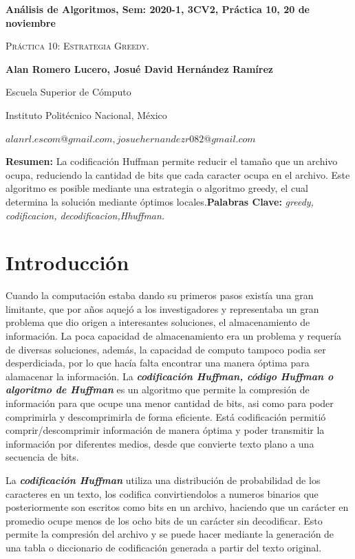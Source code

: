 \documentclass[12pt,twoside]{article}
\date{}
\begin{document}
\centerline{\bf An\'alisis de Algoritmos, Sem: 2020-1, 3CV2, Pr\'actica 10, 20 de noviembre}
\centerline{}
\centerline{}
\begin{center}
\Large{\textsc{Pr\'actica 10: Estrategia Greedy.}}
\end{center}
\centerline{\bf{Alan Romero Lucero, Josu\'e David Hern\'andez Ram\'irez}}
\centerline{}
\centerline{Escuela Superior de C\'omputo}
\centerline{Instituto Polit\'ecnico Nacional, M\'exico}
\centerline{$alanrl.escom@gmail.com, josuehernandezr082@gmail.com$}
\newtheorem{Theorem}{\quad Theorem}[section]
\newtheorem{Definition}[Theorem]{\quad Definition}
\newtheorem{Corollary}[Theorem]{\quad Corollary}
\newtheorem{Lemma}[Theorem]{\quad Lemma}
\newtheorem{Example}[Theorem]{\quad Example}
\bigskip
\textbf{Resumen:} La codificaci\'on Huffman permite reducir el tama\~no que un archivo ocupa, reduciendo la cantidad de bits que cada caracter ocupa en el archivo. Este algoritmo es posible mediante una estrategia o algoritmo greedy, el cual determina la soluci\'on mediante \'optimos locales.{\bf Palabras Clave:} {\textit{greedy, codificacion, decodificacion,Hhuffman.}}

\section{Introducci\'on}

Cuando la computaci\'on estaba dando su primeros pasos exist\'ia una gran limitante, que por a\~nos aquej\'o a los investigadores y representaba un gran problema que dio origen a interesantes soluciones, el almacenamiento de informaci\'on. La poca capacidad de almacenamiento era un problema y requer\'ia de diversas soluciones, adem\'as, la capacidad de computo tampoco podia ser desperdiciada, por lo que hac\'ia falta encontrar una manera \'optima para alamacenar la informaci\'on. La \textit{\textbf{codificaci\'on Huffman, c\'odigo Huffman o algoritmo de Huffman}} es un algoritmo que permite la compresi\'on de informaci\'on para que ocupe una menor cantidad de bits, asi como para poder comprimirla y descomprimirla de forma eficiente. Est\'a codificaci\'on permiti\'o comprir/descomprimir informaci\'on de manera \'optima y poder transmitir la informaci\'on por diferentes medios, desde que convierte texto plano a una secuencia de bits.

La \textit{\textbf{codificaci\'on Huffman}} utiliza una distribuci\'on de probabilidad de los caracteres en un texto, los codifica convirtiendolos a numeros binarios que posteriormente son escritos como bits en un archivo, haciendo que un car\'acter en promedio ocupe menos de los ocho bits de un car\'acter sin decodificar. Esto permite la compresi\'on del archivo y se puede hacer mediante la generaci\'on de una tabla o diccionario de codificaci\'on generada a partir del texto original. 
\end{document}
